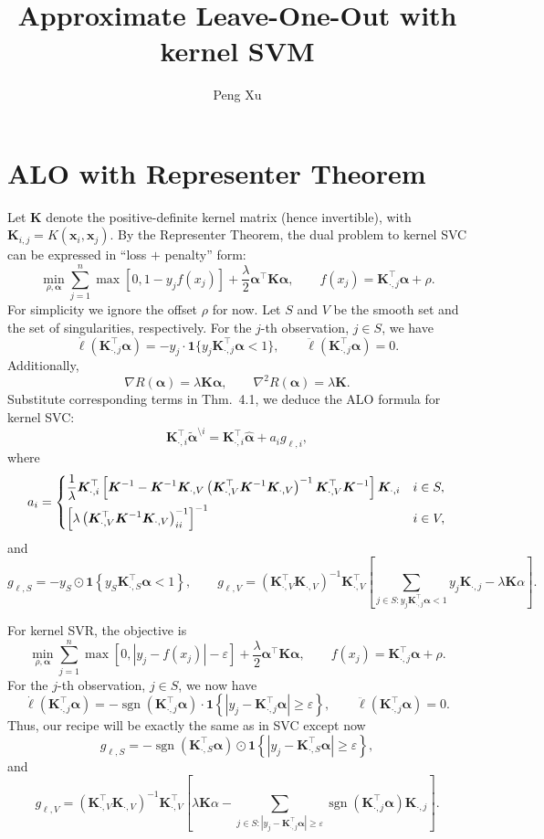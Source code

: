 \documentclass[11pt]{article}
\title{Approximate Leave-One-Out with kernel SVM}
\author{Peng Xu}
\newcommand{\bx}{\bm{x}}
\newcommand{\bK}{\bm{K}}
\newcommand{\balpha}{\bm{\alpha}}
\DeclareMathOperator{\sign}{sgn}
\newcommand{\refthm}[2]{#1~#2}
\begin{document}
\maketitle

\section{ALO with Representer Theorem}
Let \(\bK\) denote the positive-definite kernel matrix (hence invertible), with \(\bK_{i,j}=K(\bx_i,\bx_j)\). By the Representer Theorem, the dual problem to kernel SVC can be expressed in ``loss \(+\) penalty'' form:
\begin{equation}
\min_{\rho,\balpha}\sum_{j=1}^{n}\max\left[0, 1-y_jf(x_j)\right]+\frac{\lambda}{2}\balpha^\top\bK\balpha, \qquad f(x_j)=\bK_{\cdot,j}^\top\balpha+\rho.
\end{equation}
For simplicity we ignore the offset \(\rho\) for now. Let \(S\) and \(V\) be the smooth set and the set of singularities, respectively. For the \(j\)-th observation, \(j\in S\), we have \[\dot{\ell}(\bK_{\cdot,j}^\top\balpha)=-y_j\cdot\bm{1}\{y_j\bK_{\cdot,j}^\top\balpha<1\},\qquad\ddot{\ell}(\bK_{\cdot,j}^\top\balpha)=0.\] Additionally, \[\nabla R(\balpha)=\lambda\bK\balpha,\qquad\nabla^2R(\balpha)=\lambda\bK.\] Substitute corresponding terms in \refthm{Thm.}{4.1}, we deduce the ALO formula for kernel SVC: \[\bK_{\cdot,i}^\top\tilde{\balpha}^{\setminus i}=\bK_{\cdot,i}^\top\hat{\balpha}+a_ig_{\ell,i},\] where \[a_i=\begin{dcases}
\frac{1}{\lambda}\bK_{\cdot,i}^\top\left[\bK^{-1}-\bK^{-1}\bK_{\cdot,V}\left(\bK_{\cdot,V}^\top\bK^{-1}\bK_{\cdot,V}\right)^{-1}\bK_{\cdot,V}^\top\bK^{-1}\right]\bK_{\cdot,i} & i\in S,\\
\left[\lambda\left(\bK_{\cdot,V}^\top\bK^{-1}\bK_{\cdot,V}\right)^{-1}_{ii}\right]^{-1} & i\in V,
\end{dcases}\] and \[g_{\ell, S}=-y_S\odot\bm{1}\left\{y_S\bK_{\cdot,S}^\top\balpha<1\right\},\qquad g_{\ell, V}=\left(\bK_{\cdot,V}^\top\bK_{\cdot,V}\right)^{-1}\bK_{\cdot,V}^\top\left[\sum_{j\in S:y_j\bK_{\cdot,j}^\top\balpha<1}y_j\bK_{\cdot,j}-\lambda\bK\alpha\right].\]

For kernel SVR, the objective is 
\begin{equation}
\min_{\rho,\balpha}\sum_{j=1}^{n}\max\left[0, |y_j-f(x_j)|-\varepsilon\right]+\frac{\lambda}{2}\balpha^\top\bK\balpha, \qquad f(x_j)=\bK_{\cdot,j}^\top\balpha+\rho.
\end{equation} 
For the \(j\)-th observation, \(j\in S\), we now have \[\dot{\ell}(\bK_{\cdot,j}^\top\balpha)=-\sign\left(\bK_{\cdot,j}^\top\balpha\right)\cdot\bm{1}\left\{\left|y_j-\bK_{\cdot,j}^\top\balpha\right|\geq\varepsilon\right\},\qquad\ddot{\ell}(\bK_{\cdot,j}^\top\balpha)=0.\] Thus, our recipe will be exactly the same as in SVC except now \[g_{\ell, S}=-\sign\left(\bK_{\cdot,S}^\top\balpha\right)\odot\bm{1}\left\{\left|y_j-\bK_{\cdot,S}^\top\balpha\right|\geq\varepsilon\right\},\] and \[g_{\ell, V}=\left(\bK_{\cdot,V}^\top\bK_{\cdot,V}\right)^{-1}\bK_{\cdot,V}^\top\left[\lambda\bK\alpha-\sum_{j\in S:\left|y_j-\bK_{\cdot,j}^\top\balpha\right|\geq\varepsilon}\sign\left(\bK_{\cdot,j}^\top\balpha\right)\bK_{\cdot,j}\right].\]
\end{document}
